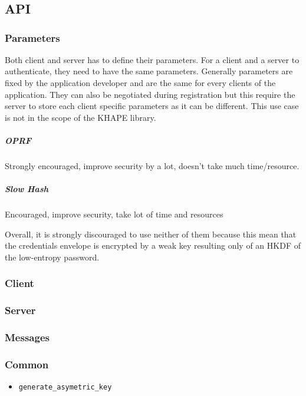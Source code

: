 \documentclass[../report.tex]{subfiles}
\begin{document}
\chapter{}
\section{API}
\subsection{Parameters}
Both client and server has to define their parameters. For a client and a server to authenticate, they need to have the same parameters. 
Generally parameters are fixed by the application developer and are the same for every clients of the application.
They can also be negotiated during registration but this require the server to store each client specific parameters as it can be different. This use case is not in the scope of the KHAPE library.

\paragraph{OPRF}
Strongly encouraged, improve security by a lot, doesn't take much time/resource.
\paragraph{Slow Hash}
Encouraged, improve security, take lot of time and resources

Overall, it is strongly discouraged to use neither of them because this mean that the credentials envelope is encrypted by a weak key resulting only of an HKDF of the low-entropy password.


\subsection{Client}
\subsection{Server}
\subsection{Messages}

\subsection{Common}
\begin{itemize}
 \item \verb|generate_asymetric_key|
\end{itemize}
\end{document}
